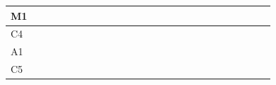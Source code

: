 \documentclass[journal,onecolumn]{IEEEtran}
\begin{document}
\begin{table}[ht]
\begin{tabular}{|l|llllll|llllll|llllll|llllll|}
M1   &                          &                          &                          &                          &                          &                          &                          &                          &                          &                          &                          &                          &                          & \cellcolor[HTML]{7AA2F7} &                          &                          &                          &                          &                          &                          &                          &                          &                          &  \\ \hline
C4   &                          &                          &                          &                          &                          &                          &                          &                          &                          &                          &                          &                          &                          &                          & \cellcolor[HTML]{414868} & \cellcolor[HTML]{414868} &                          &                          &                          &                          &                          &                          &                          &  \\ \hline
A1   &                          &                          &                          &                          &                          &                          &                          &                          &                          &                          &                          &                          &                          &                          &                          &                          & \cellcolor[HTML]{414868} &                          &                          &                          &                          &                          &                          &  \\ \hline
C5   &                          &                          &                          &                          &                          &                          &                          &                          &                          &                          &                          &                          &                          &                          &                          &                          &                          & \cellcolor[HTML]{414868} & \cellcolor[HTML]{414868} & \cellcolor[HTML]{414868} &                          &                          &                          &  \\ \hline

\end{tabular}
\end{table}
\end{document}
